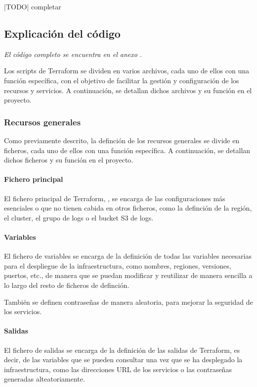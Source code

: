 |TODO| completar

\newpage{}
\subsection{Explicación del código}\label{sec:impl_configuracion}
\emph{El código completo se encuentra en el anexo .}

Los scripts de Terraform se dividen en varios archivos, cada uno de ellos con
una función específica, con el objetivo de facilitar la gestión y configuración
de los recursos y servicios. A continuación, se detallan dichos archivos y su
función en el proyecto.


\subsubsection{Recursos generales}
Como previamente descrito, la definción de los recursos generales se divide en
ficheros, cada uno de ellos con una función específica. A continuación, se
detallan dichos ficheros y su función en el proyecto.


\paragraph{Fichero principal}
El fichero principal de Terraform, , se encarga de
las configuraciones más esenciales o que no tienen cabida en otros ficheros,
como la definción de la región, el cluster, el grupo de logs o el bucket S3 de
logs.


\paragraph{Variables}
El fichero de variables 
se encarga de la definición de todas las variables necesarias para el despliegue
de la infraestructura, como nombres, regiones, versiones, puertos, etc., de
manera que se puedan modificar y
reutilizar de manera sencilla a lo largo del resto de ficheros de definción.

También se definen contraseñas de manera aleatoria, para mejorar la seguridad
de los servicios.


\paragraph{Salidas}
El fichero de salidas  se encarga de la
definición de las salidas de Terraform, es decir, de las variables que se pueden
consultar una vez que se ha desplegado la infraestructura, como las direcciones
URL de los servicios o las contraseñas generadas alteatoriamente.

